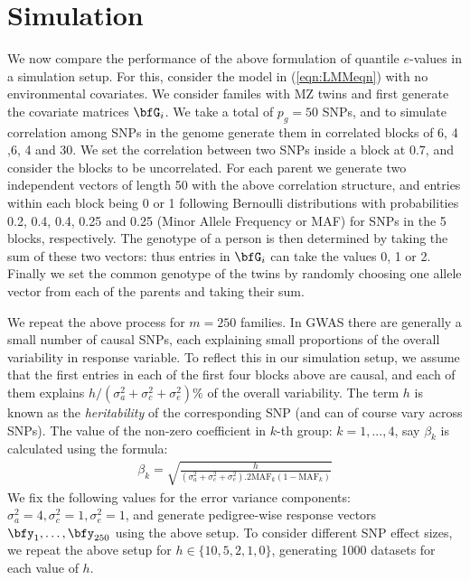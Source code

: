 \section{Simulation}
\label{sec:SimSection}

We now compare the performance of the above formulation of quantile $e$-values in a simulation setup. For this, consider the model in (\ref{eqn:LMMeqn}) with no environmental covariates. We consider familes with MZ twins and first generate the covariate matrices $\bfG_i$. We take a total of $p_g = 50$ SNPs, and to simulate correlation among SNPs in the genome generate them in correlated blocks of 6, 4 ,6, 4 and 30. We set the correlation between two SNPs inside a block at 0.7, and consider the blocks to be uncorrelated. For each parent we generate two independent vectors of length 50 with the above correlation structure, and entries within each block being 0 or 1 following Bernoulli distributions with probabilities 0.2, 0.4, 0.4, 0.25 and 0.25 (Minor Allele Frequency or MAF) for SNPs in the 5 blocks, respectively. The genotype of a person is then determined by taking the sum of these two vectors: thus entries in $\bfG_i$ can take the values 0, 1 or 2. Finally we set the common genotype of the twins by randomly choosing one allele vector from each of the parents and taking their sum.

We repeat the above process for $m=250$ families. In GWAS there are generally a small number of causal SNPs, each explaining small proportions of the overall variability in response variable. To reflect this in our simulation setup, we assume that the first entries in each of the first four blocks above are causal, and each of them explains $h/(\sigma_a^2+\sigma_c^2+\sigma_e^2) \%$ of the overall variability. The term $h$ is known as the \textit{heritability} of the corresponding SNP (and can of course vary across SNPs). The value of the non-zero coefficient in $k$-th group: $k = 1, ..., 4$, say $\beta_k$ is calculated using the formula:
%
\begin{align}
\beta_k = \sqrt{ \frac{h}{(\sigma_a^2+\sigma_c^2+\sigma_e^2). 2 \text{MAF}_k (1 - \text{MAF}_k) }}
\end{align}
%
We fix the following values for the error variance components: $\sigma_a^2 = 4, \sigma_c^2 = 1, \sigma_e^2 = 1$, and generate pedigree-wise response vectors $\bfy_1, \ldots, \bfy_{250}$ using the above setup. To consider different SNP effect sizes, we repeat the above setup for $h \in \{10, 5, 2, 1, 0 \}$, generating 1000 datasets for each value of $h$.

